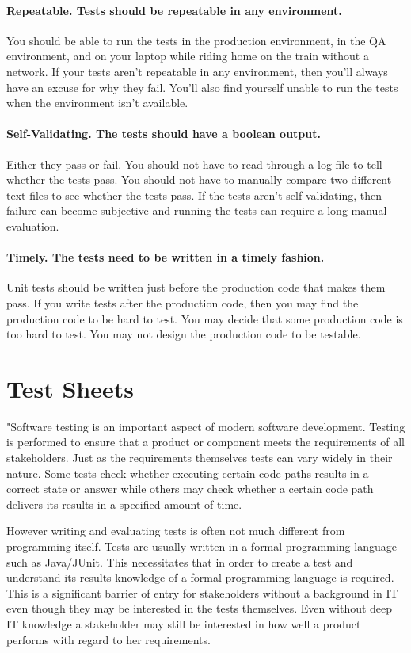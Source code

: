 \documentclass{llncs}
\begin{document}
\paragraph{Repeatable. Tests should be repeatable in any environment.}
You should be able to run the tests in the production environment, in the QA environment, and on your laptop while riding home on the train without a network. 
If your tests aren’t repeatable in any environment, then you’ll always have an excuse for why they fail. 
You’ll also ﬁnd yourself unable to run the tests when the environment isn’t available.\cite{MartinClean}

\paragraph{Self-Validating. The tests should have a boolean output.}
Either they pass or fail. 
You should not have to read through a log file to tell whether the tests pass. 
You should not have to manually compare two different text ﬁles to see whether the tests pass. 
If the tests aren’t self-validating, then failure can become subjective and running the tests can require a long manual evaluation.\cite{MartinClean}

\paragraph{Timely. The tests need to be written in a timely fashion.}
Unit tests should be written just before the production code that makes them pass. 
If you write tests after the production code, then you may ﬁnd the production code to be hard to test. 
You may decide that some production code is too hard to test. 
You may not design the production code to be testable.\cite{MartinClean}

\section{Test Sheets}
"Software testing is an important aspect of modern software development.
Testing is performed to ensure that a product or component meets the requirements of all stakeholders.
Just as the requirements themselves tests can vary widely in their nature.
Some tests check whether executing certain code paths results in a correct state or answer while others may check whether a certain code path delivers its results in a specified amount of time.

However writing and evaluating tests is often not much different from programming itself.
Tests are usually written in a formal programming language such as Java/JUnit.
This necessitates that in order to create a test and understand its results knowledge of a formal programming language is required.
This is a significant barrier of entry for stakeholders without a background in IT even though they may be interested in the tests themselves.
Even without deep IT knowledge a stakeholder may still be interested in how well a product performs with regard to her requirements.
\end{document}
